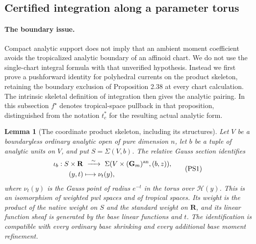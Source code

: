 \documentclass[11pt,a4paper]{article}
\newtheorem{lemma}[theorem]{Lemma}
\theoremstyle{definition}
\theoremstyle{remark}
\begin{document}
\subsection{Certified integration along a parameter torus}

\paragraph*{The boundary issue.}
Compact analytic support does not imply that an ambient moment
coefficient avoids the tropicalized analytic boundary of an affinoid
chart.  We do not use the single-chart integral formula with that
unverified hypothesis.  Instead we first prove a pushforward identity
for polyhedral currents on the product skeleton, retaining the boundary
exclusion of Proposition 2.38 at every chart calculation.  The
intrinsic skeletal definition of integration then gives the analytic
pairing.  In this subsection $f^\star$ denotes tropical-space pullback
in that proposition, distinguished from the notation $t_c^*$ for the
resulting actual analytic form.

\begin{lemma}[The coordinate product skeleton, including its structures]
\label{r11p:coordinate-product-skeleton}
Let $V$ be a boundaryless ordinary analytic open of pure dimension $n$,
let $b$ be a tuple of analytic units on $V$, and put $S=\Sigma(V,b)$.
The relative Gauss section identifies
\[
 \begin{split}
 \iota_b:S\times\mathbf R&\ \xrightarrow{\ \sim\ }\
       \Sigma(V\times(\mathbf G_m)^{\rm an},(b,z)),\\
                  (y,t)&\longmapsto \nu_t(y),
 \end{split}
\tag{PS1}\label{r11p:product-skeleton-identity}
\]
where $\nu_t(y)$ is the Gauss point of radius $e^{-t}$ in the torus
over $\mathcal H(y)$.  This is an isomorphism of weighted pwl spaces
and of tropical spaces.  Its weight is the product of the native
weight on $S$ and the standard weight on $\mathbf R$, and its linear
function sheaf is generated by the base linear functions and $t$.
The identification is compatible with every ordinary base shrinking
and every additional base moment refinement.
\end{lemma}
\end{document}
